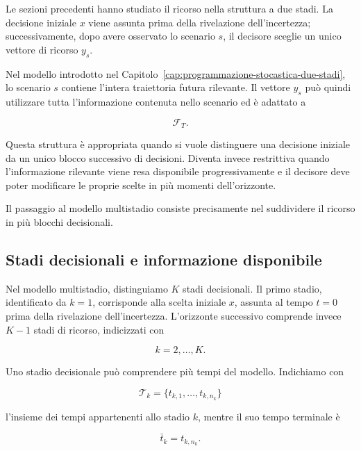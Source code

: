 Le sezioni precedenti hanno studiato il ricorso nella struttura a due stadi.
La decisione iniziale $x$ viene assunta prima della rivelazione
dell'incertezza; successivamente, dopo avere osservato lo scenario $s$, il
decisore sceglie un unico vettore di ricorso $y_s$.

Nel modello introdotto nel Capitolo~\ref{cap:programmazione-stocastica-due-stadi},
lo scenario $s$ contiene l'intera traiettoria futura rilevante. Il vettore
$y_s$ pu\`o quindi utilizzare tutta l'informazione contenuta nello scenario
ed \`e adattato a

\[
\mathcal F_T.
\]

Questa struttura \`e appropriata quando si vuole distinguere una decisione
iniziale da un unico blocco successivo di decisioni. Diventa invece
restrittiva quando l'informazione rilevante viene resa disponibile
progressivamente e il decisore deve poter modificare le proprie scelte in
pi\`u momenti dell'orizzonte.

Il passaggio al modello multistadio consiste precisamente nel suddividere il
ricorso in pi\`u blocchi decisionali.

\subsection{Stadi decisionali e informazione disponibile}


Nel modello multistadio, distinguiamo $K$ stadi
decisionali. Il primo stadio, identificato da $k=1$,
corrisponde alla scelta iniziale $x$, assunta al
tempo $t=0$ prima della rivelazione dell'incertezza.
L'orizzonte successivo comprende invece $K-1$
stadi di ricorso, indicizzati con

\[
k=2,\ldots,K.
\]


Uno stadio decisionale pu\`{o} comprendere pi\`{u}
tempi del modello. Indichiamo con


\[
\mathcal T_k
=
\{t_{k,1},\ldots,t_{k,n_k}\}
\]

\noindent l'insieme dei tempi appartenenti allo stadio $k$,
mentre il suo tempo terminale \`{e}


\[
\bar t_k
=
t_{k,n_k}.
\]

